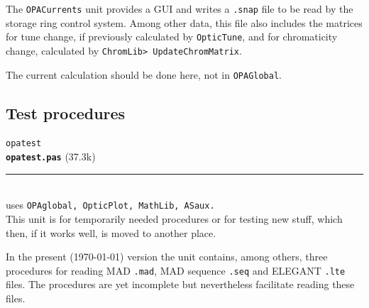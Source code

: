 \documentclass[12pt]{article}
\newcommand\code[1]{{\tt #1}}
\newcommand{\opauni}[1]{\colorbox{orange!30}{\code{#1}}}
\newcommand{\ounih}[2]{\subsection{\label{#2}#1}{\Huge\opauni{#2}}\\}
\newcommand{\todo}[1]{{\color{red} #1}}
\newcommand\opamodule[3]{{\bf \tt #1} #2\\  \rule[3pt]{\textwidth}{0.2pt} \\ {\scriptsize uses \tt  #3}\\[1ex]}
\begin{document}
The {\tt OPACurrents} unit provides a GUI and writes a {\tt .snap} file to be read by the storage ring control system. Among other data, this file also includes the matrices for tune change, if previously calculated by \code{OpticTune}, and for chromaticity change, calculated by \code{ChromLib> UpdateChromMatrix}.

\todo{The current calculation should be done here, not in {\tt OPAGlobal}.}\\







\ounih{Test procedures}{opatest} 


\opamodule{opatest.pas}{(37.3k)}{OPAglobal, OpticPlot, MathLib, ASaux.}
This unit is for temporarily needed procedures or for testing new stuff, which then, if it works well, is moved to another place.

In the present (\today) version the unit contains, among others, three procedures for reading MAD {\tt .mad}, MAD sequence {\tt .seq} and ELEGANT {\tt .lte} files. The procedures are yet incomplete but nevertheless facilitate reading these files.\\
\end{document}
